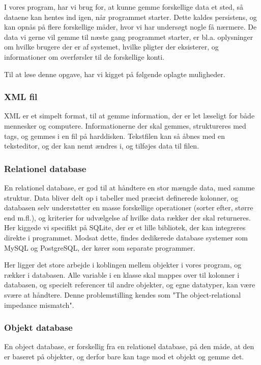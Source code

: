 I vores program, har vi brug for, at kunne gemme forskellige data et sted, så dataene kan hentes ind igen, når programmet starter. Dette kaldes persistens, og kan opnås på flere forskellige måder, hvor vi har undersøgt nogle få nærmere.
De data vi gerne vil gemme til næste gang programmet starter, er bl.a. oplysninger om hvilke brugere der er af systemet, hvilke pligter der eksisterer, og informationer om overførsler til de forskellige konti.

Til at løse denne opgave, har vi kigget på følgende oplagte muligheder.

\subsubsection{XML fil}
XML er et simpelt format, til at gemme information, der er let læseligt for både mennesker og computere. Informationerne der skal gemmes, struktureres med tags, og gemmes i en fil på harddisken\cite{xmlspecs}. Tekstfilen kan så åbnes med en teksteditor, og der kan nemt ændres i, og tilføjes data til filen.


\subsubsection{Relationel database}
En relationel database, er god til at håndtere en stor mængde data, med samme struktur. Data bliver delt op i tabeller med præcist definerede kolonner, og databasen selv understøtter en masse forskellige operationer (sorter efter, større end m.fl.), og kriterier for udvælgelse af hvilke data rækker der skal returneres. Her kiggede vi specifikt på SQLite, der er et lille bibliotek, der kan integreres direkte i programmet. Modsat dette, findes dedikerede database systemer som MySQL og PostgreSQL, der kører som separate programmer.

Her ligger det store arbejde i koblingen mellem objekter i vores program, og rækker i databasen. Alle variable i en klasse skal mappes over til kolonner i databasen, og specielt referencer til andre objekter, og egne datatyper, kan være svære at håndtere. Denne problemstilling kendes som "The object-relational impedance mismatch"\cite{ORIM}.

\subsubsection{Objekt database}
En object database,  er forskellig fra en relationel database, på den måde, at den er baseret på objekter, og derfor bare kan tage mod et objekt og gemme det.

